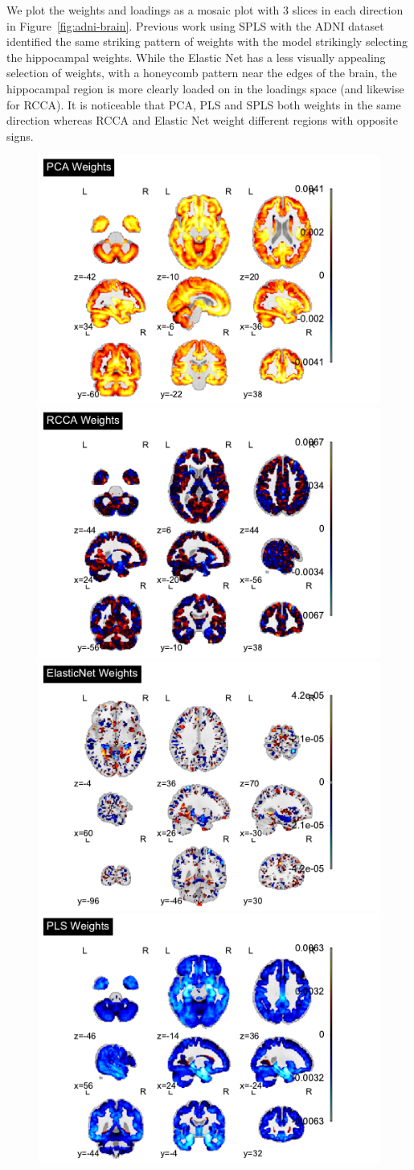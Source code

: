 We plot the weights and loadings as a mosaic plot with 3 slices in each direction in Figure~\ref{fig:adni-brain}.
Previous work using SPLS with the ADNI dataset identified the same striking pattern of weights with the model strikingly selecting the hippocampal weights\cite{monteiro2016multiple}.
While the Elastic Net has a less visually appealing selection of weights, with a honeycomb pattern near the edges of the brain, the hippocampal region is more clearly loaded on in the loadings space (and likewise for RCCA).
It is noticeable that PCA, PLS and SPLS both weights in the same direction whereas RCCA and Elastic Net weight different regions with opposite signs.

\begin{figure}
\centering
\includegraphics[width=0.45\linewidth]{figures/adni/PCA brain weights mosaic}
\includegraphics[width=0.45\linewidth]{figures/adni/RCCA brain weights mosaic}
\includegraphics[width=0.45\linewidth]{figures/adni/ElasticNet brain weights mosaic}
\includegraphics[width=0.45\linewidth]{figures/adni/PLS brain weights mosaic}

\end{figure}
